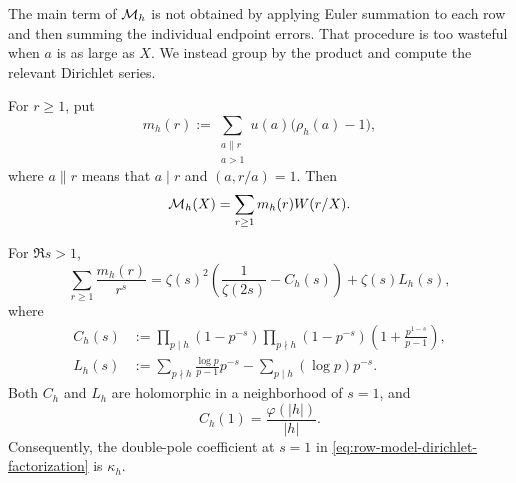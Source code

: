 The main term of $\mathcal M_h$ is not obtained by applying Euler summation to
each row and then summing the individual endpoint errors.  That procedure
is too wasteful when $a$ is as large as $X$.  We instead group by the
product and compute the relevant Dirichlet series.

For $r\geq1$, put
\begin{equation}
 m_h(r):=
 \sum_{\substack{a\parallel r\\a>1}}
 u(a)\bigl(\rho_h(a)-1\bigr),
 \label{eq:row-model-product-coefficient}
\end{equation}
where $a\parallel r$ means that $a\mid r$ and $(a,r/a)=1$.  Then
\begin{equation}
 \mathcal M_h(X)=\sum_{r\geq1}m_h(r)W(r/X).
 \label{eq:row-model-product-grouping}
\end{equation}

\begin{lemma}
\label{lem:row-model-dirichlet-factorization}
For $\Re s>1$,
\begin{equation}
 \sum_{r\geq1}\frac{m_h(r)}{r^s}
 =\zeta(s)^2\left(\frac1{\zeta(2s)}-C_h(s)\right)
 +\zeta(s)L_h(s),
 \label{eq:row-model-dirichlet-factorization}
\end{equation}
where
\begin{align}
 C_h(s)
 &:={}
 \prod_{p\mid h}(1-p^{-s})
 \prod_{p\nmid h}
 (1-p^{-s})
 \left(1+\frac{p^{1-s}}{p-1}\right),
 \label{eq:Ch-euler-product}\\
 L_h(s)
 &:={}
 \sum_{p\nmid h}\frac{\log p}{p-1}p^{-s}
 -\sum_{p\mid h}(\log p)p^{-s}.
 \label{eq:Lh-prime-series}
\end{align}
Both $C_h$ and $L_h$ are holomorphic in a neighborhood of $s=1$, and
\begin{equation}
 C_h(1)=\frac{\varphi(|h|)}{|h|}.
 \label{eq:Ch-at-one}
\end{equation}
Consequently, the double-pole coefficient at $s=1$ in
\eqref{eq:row-model-dirichlet-factorization} is $\kappa_h$.
\end{lemma}

